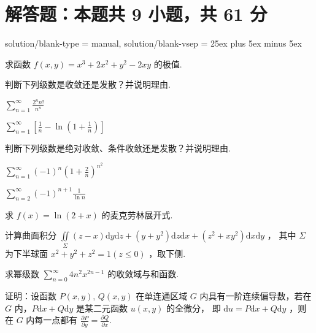 \section{解答题：本题共 9 小题，共 61 分}
\examsetup
{
    solution/blank-type = manual,
    solution/blank-vsep = 25ex plus 5ex minus 5ex
}

\begin{problem}[points = 8]
求函数 $f(x, y) = x^3 + 2x^2 + y^2 -2xy$ 的极值.
\end{problem}

\begin{problem}[points = 8]
判断下列级数是收敛还是发散？并说明理由.
\end{problem}
\begin{calculations}[columns = 2, label = (\arabic*)]
    \item $\sum\limits_{n = 1}^{\infty} \frac{2^nn!}{n^n}$
    \item $\sum\limits_{n = 1}^{\infty} \left[\frac{1}{n} - \ln{\left(1 + \frac{1}{n}\right)}\right]$
\end{calculations}

\begin{problem}[points = 8]
判断下列级数是绝对收敛、条件收敛还是发散？并说明理由.
\end{problem}
\begin{calculations}[columns = 2, label = (\arabic*)]
    \item $\sum\limits_{n = 1}^{\infty} (-1)^n\left(1 + \frac{2}{n}\right)^{n^2}$
    \item $\sum\limits_{n = 2}^{\infty} (-1)^{n + 1}\frac{1}{\ln{n}}$
\end{calculations}

\begin{problem}[points = 8]
求 $f(x) = \ln{(2 + x)}$ 的麦克劳林展开式.
\end{problem}

\begin{problem}[points = 8]
计算曲面积分 $\iint\limits_\Sigma (z - x)\mathrm{d}y\mathrm{d}z + (y + y^2)\mathrm{d}z\mathrm{d}x + (z^2 + xy^2)\mathrm{d}x\mathrm{d}y$ ，
其中 $\Sigma$ 为下半球面 $x^2 + y^2 + z^2 = 1(z \leq 0)$ ，取下侧.
\end{problem}

\begin{problem}[points = 8]
求幂级数 $\sum\limits_{n = 0}^{\infty} 4n^2x^{2n - 1}$ 的收敛域与和函数.
\end{problem}

\begin{problem}[points = 5]
证明：设函数 $P(x, y),\, Q(x, y)$ 在单连通区域 $G$ 内具有一阶连续偏导数，若在 $G$ 内，$P\mathrm{d}x + Q\mathrm{d}y$ 是某二元函数 $u(x, y)$ 的全微分，
即 $\mathrm{d}u = P\mathrm{d}x + Q\mathrm{d}y$ ，则在 $G$ 内每一点都有 $\frac{\partial P}{\partial y} = \frac{\partial Q}{\partial x}$.
\end{problem}

